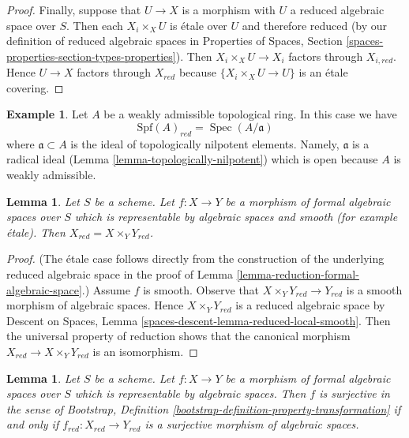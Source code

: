 \documentclass{stacks-project}
\theoremstyle{plain}
\newtheorem{lemma}[subsection]{Lemma}
\theoremstyle{definition}
\newtheorem{example}[subsection]{Example}
\theoremstyle{remark}
\numberwithin{equation}{subsection}
\def\Spec{\mathop{\mathrm{Spec}}}
\begin{document}
\begin{proof}
\medskip\noindent
Finally, suppose that $U \to X$ is a morphism with
$U$ a reduced algebraic space over $S$. Then each $X_i \times_X U$
is \'etale over $U$ and therefore reduced (by our definition of
reduced algebraic spaces in Properties of Spaces, Section
\ref{spaces-properties-section-types-properties}).
Then $X_i \times_X U \to X_i$ factors through $X_{i, red}$.
Hence $U \to X$ factors through $X_{red}$ because
$\{X_i \times_X U \to U\}$ is an \'etale covering.
\end{proof}

\begin{example}
\label{example-reduction-affine-formal-spectrum}
Let $A$ be a weakly admissible topological ring. In this case we have
$$
\text{Spf}(A)_{red} = \Spec(A/\mathfrak a)
$$
where $\mathfrak a \subset A$ is the ideal of topologically nilpotent
elements. Namely, $\mathfrak a$ is a radical ideal
(Lemma \ref{lemma-topologically-nilpotent})
which is open because $A$ is weakly admissible.
\end{example}

\begin{lemma}
\label{lemma-reduction-smooth}
Let $S$ be a scheme. Let $f : X \to Y$ be a morphism of
formal algebraic spaces over $S$ which is representable by
algebraic spaces and smooth (for example \'etale).
Then $X_{red} = X \times_Y Y_{red}$.
\end{lemma}

\begin{proof}
(The \'etale case follows directly from the construction of
the underlying reduced algebraic space in the proof of
Lemma \ref{lemma-reduction-formal-algebraic-space}.)
Assume $f$ is smooth. Observe that $X \times_Y Y_{red} \to Y_{red}$
is a smooth morphism of algebraic spaces. Hence $X \times_Y Y_{red}$
is a reduced algebraic space by Descent on Spaces, Lemma
\ref{spaces-descent-lemma-reduced-local-smooth}.
Then the universal property of reduction shows that the canonical morphism
$X_{red} \to X \times_Y Y_{red}$ is an isomorphism.
\end{proof}

\begin{lemma}
\label{lemma-reduction-surjective}
Let $S$ be a scheme. Let $f : X \to Y$ be a morphism of
formal algebraic spaces over $S$ which is representable by
algebraic spaces. Then $f$ is surjective in the sense of
Bootstrap, Definition \ref{bootstrap-definition-property-transformation}
if and only if $f_{red} : X_{red} \to Y_{red}$ is a
surjective morphism of algebraic spaces.
\end{lemma}
\end{document}
